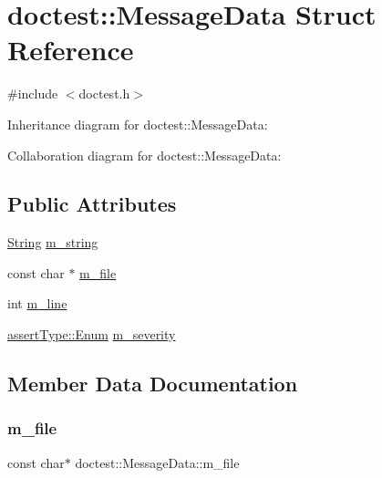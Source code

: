 \hypertarget{structdoctest_1_1_message_data}{}\section{doctest\+:\+:Message\+Data Struct Reference}
\label{structdoctest_1_1_message_data}


{\ttfamily \#include $<$doctest.\+h$>$}



Inheritance diagram for doctest\+:\+:Message\+Data\+:


Collaboration diagram for doctest\+:\+:Message\+Data\+:
\subsection*{Public Attributes}
\begin{DoxyCompactItemize}
\item 
\hyperlink{classdoctest_1_1_string}{String} \hyperlink{structdoctest_1_1_message_data_a0ef5cfd7a399ee475d6357b6dcddfe53}{m\+\_\+string}
\item 
const char $\ast$ \hyperlink{structdoctest_1_1_message_data_acd1e6a5c4f03ed6e098cdab5956a3e17}{m\+\_\+file}
\item 
int \hyperlink{structdoctest_1_1_message_data_a7c1cf03250a68db5befbba63b3824d93}{m\+\_\+line}
\item 
\hyperlink{namespacedoctest_1_1assert_type_ae1bb5bed722f34f1c38b83cb19d326d3}{assert\+Type\+::\+Enum} \hyperlink{structdoctest_1_1_message_data_a24e0a3f475609ce8e02cecc4cb0d3b48}{m\+\_\+severity}
\end{DoxyCompactItemize}


\subsection{Member Data Documentation}
\mbox{\label{structdoctest_1_1_message_data_acd1e6a5c4f03ed6e098cdab5956a3e17}} 
\subsubsection{\texorpdfstring{m\+\_\+file}{m\_file}}
{\footnotesize\ttfamily const char$\ast$ doctest\+::\+Message\+Data\+::m\+\_\+file}

